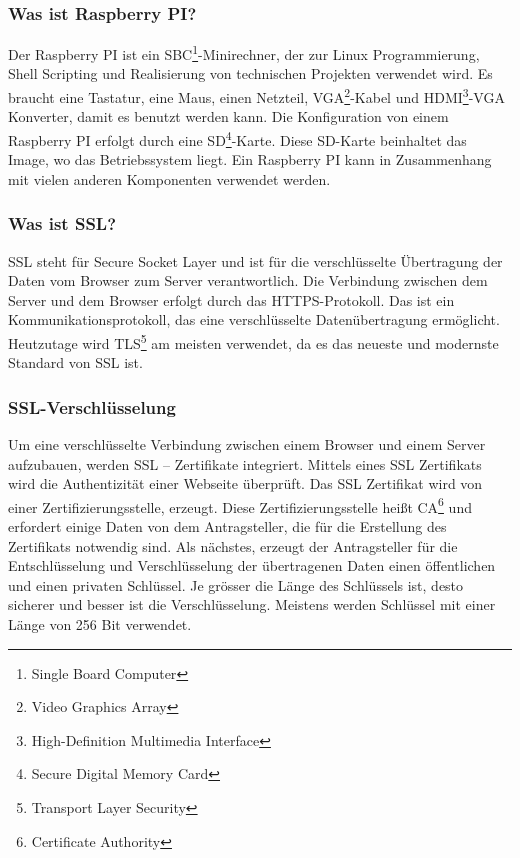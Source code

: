 \subsubsection{Was ist Raspberry PI?} 
Der Raspberry PI ist ein SBC\footnote{Single Board Computer}-Minirechner, der zur Linux Programmierung, Shell Scripting und Realisierung von technischen Projekten verwendet wird. Es braucht eine Tastatur, eine Maus, einen Netzteil, VGA\footnote{Video Graphics Array}-Kabel und HDMI\footnote{High-Definition Multimedia Interface}-VGA Konverter, damit es benutzt werden kann. Die Konfiguration von einem Raspberry PI erfolgt durch eine SD\footnote{Secure Digital Memory Card}-Karte. Diese SD-Karte beinhaltet das Image, wo das Betriebssystem liegt. Ein Raspberry PI kann in Zusammenhang mit vielen anderen Komponenten verwendet werden.\cite{50_raspi}
\subsubsection{Was ist SSL?} 
SSL steht für Secure Socket Layer und ist für die verschlüsselte Übertragung der Daten vom Browser zum Server verantwortlich. Die Verbindung zwischen dem Server und dem Browser erfolgt durch das HTTPS-Protokoll. Das ist ein Kommunikationsprotokoll, das eine verschlüsselte Datenübertragung ermöglicht. Heutzutage wird TLS\footnote{Transport Layer Security} am meisten verwendet, da es das neueste und modernste Standard von SSL ist. \cite{50_ssl}
\subsubsection{SSL-Verschlüsselung}
Um eine verschlüsselte Verbindung zwischen einem Browser und einem Server aufzubauen, werden SSL – Zertifikate integriert. Mittels eines SSL Zertifikats wird die Authentizität einer Webseite überprüft. Das SSL Zertifikat wird von einer Zertifizierungsstelle, erzeugt. Diese Zertifizierungsstelle heißt CA\footnote{Certificate Authority} und erfordert einige Daten von dem Antragsteller, die für die Erstellung des Zertifikats notwendig sind. Als nächstes, erzeugt der Antragsteller für die Entschlüsselung und Verschlüsselung der übertragenen Daten einen öffentlichen und einen privaten Schlüssel. Je grösser die Länge des Schlüssels ist, desto sicherer und besser ist die Verschlüsselung. Meistens werden Schlüssel mit einer Länge von 256 Bit verwendet. \cite{50_ssl}


